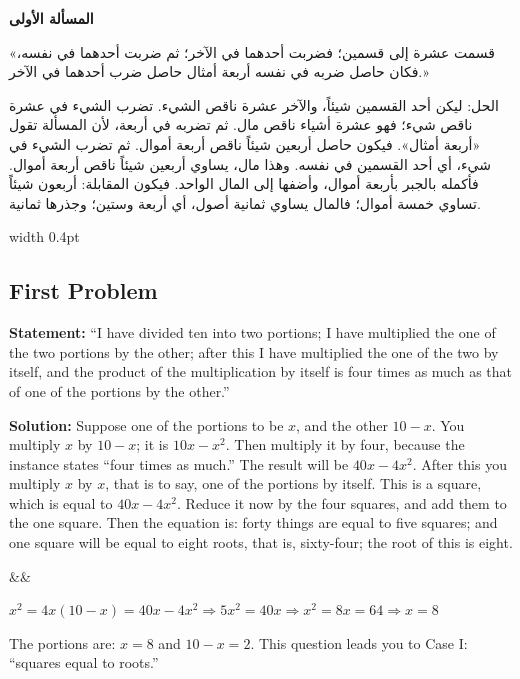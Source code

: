 \documentclass[11pt,a4paper]{book}
\newenvironment{mathbox}[1][]{%
  \smallskip\par\noindent
  \begin{lrbox}{\mathboxsave}
  \begin{minipage}{\dimexpr\linewidth-2\fboxsep-2\fboxrule\relax}%
  \setlength{\parskip}{0.3em}%
  \ifx&#1&\else\textbf{#1}\\[0.2cm]\fi
}{%
  \end{minipage}%
  \end{lrbox}
  \fcolorbox{sectioncolor}{mathbg}{\usebox{\mathboxsave}}%
  \smallskip}
\begin{document}
\noindent\begin{minipage}[t]{0.48\textwidth}
\raggedleft

\begin{Arabic}
\textbf{المسألة الأولى}

«قسمت عشرة إلى قسمين؛ فضربت أحدهما في الآخر؛ ثم ضربت أحدهما في نفسه، فكان حاصل ضربه في نفسه أربعة أمثال حاصل ضرب أحدهما في الآخر.»

الحل: ليكن أحد القسمين شيئاً، والآخر عشرة ناقص الشيء. تضرب الشيء في عشرة ناقص شيء؛ فهو عشرة أشياء ناقص مال. ثم تضربه في أربعة، لأن المسألة تقول «أربعة أمثال». فيكون حاصل أربعين شيئاً ناقص أربعة أموال. ثم تضرب الشيء في شيء، أي أحد القسمين في نفسه. وهذا مال، يساوي أربعين شيئاً ناقص أربعة أموال. فأكمله بالجبر بأربعة أموال، وأضفها إلى المال الواحد. فيكون المقابلة: أربعون شيئاً تساوي خمسة أموال؛ فالمال يساوي ثمانية أصول، أي أربعة وستين؛ وجذرها ثمانية.
\end{Arabic}

\end{minipage}%
\hfill\vrule width 0.4pt\hfill
\begin{minipage}[t]{0.48\textwidth}
\raggedright

\subsection*{First Problem}

\textbf{Statement:} ``I have divided ten into two portions; I have multiplied the one of the two portions by the other; after this I have multiplied the one of the two by itself, and the product of the multiplication by itself is four times as much as that of one of the portions by the other.''

\textbf{Solution:} Suppose one of the portions to be $x$, and the other $10 - x$. You multiply $x$ by $10 - x$; it is $10x - x^2$. Then multiply it by four, because the instance states ``four times as much.'' The result will be $40x - 4x^2$. After this you multiply $x$ by $x$, that is to say, one of the portions by itself. This is a square, which is equal to $40x - 4x^2$. Reduce it now by the four squares, and add them to the one square. Then the equation is: forty things are equal to five squares; and one square will be equal to eight roots, that is, sixty-four; the root of this is eight.

\begin{mathbox}
$x^2 = 4x(10-x) = 40x - 4x^2 \Rightarrow 5x^2 = 40x \Rightarrow x^2 = 8x = 64 \Rightarrow x = 8$
\end{mathbox}

The portions are: $x = 8$ and $10 - x = 2$. This question leads you to Case I: ``squares equal to roots.''

\end{minipage}
\vspace{0.3cm}
\end{document}
